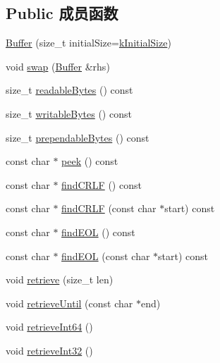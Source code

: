 \subsection*{Public 成员函数}
\begin{DoxyCompactItemize}
\item 
\hyperlink{classmuduo_1_1net_1_1Buffer_a3189a466a75c249c9371b74325e4fc53}{Buffer} (size\+\_\+t initial\+Size=\hyperlink{classmuduo_1_1net_1_1Buffer_a50181a12c6e534352c6c3cf9e0d8b331}{k\+Initial\+Size})
\item 
void \hyperlink{classmuduo_1_1net_1_1Buffer_a5a6560acf9880bf7a3b210c07bb3db2e}{swap} (\hyperlink{classmuduo_1_1net_1_1Buffer}{Buffer} \&rhs)
\item 
size\+\_\+t \hyperlink{classmuduo_1_1net_1_1Buffer_afba1d23196411daa43950fdbbff6d724}{readable\+Bytes} () const
\item 
size\+\_\+t \hyperlink{classmuduo_1_1net_1_1Buffer_a998888da42aba8e7ff1977405f7c33e3}{writable\+Bytes} () const
\item 
size\+\_\+t \hyperlink{classmuduo_1_1net_1_1Buffer_ad738bbd8321f518ca5cdfac842993d04}{prependable\+Bytes} () const
\item 
const char $\ast$ \hyperlink{classmuduo_1_1net_1_1Buffer_ad1339d8b1a42e9762ae6cd3add003706}{peek} () const
\item 
const char $\ast$ \hyperlink{classmuduo_1_1net_1_1Buffer_a757db069730494fc47e500b29851c6c5}{find\+C\+R\+LF} () const
\item 
const char $\ast$ \hyperlink{classmuduo_1_1net_1_1Buffer_ac0c8bd8a269f6d31932e0f7bab608fdf}{find\+C\+R\+LF} (const char $\ast$start) const
\item 
const char $\ast$ \hyperlink{classmuduo_1_1net_1_1Buffer_acf4decda782c75e8f198c95de2958409}{find\+E\+OL} () const
\item 
const char $\ast$ \hyperlink{classmuduo_1_1net_1_1Buffer_a29e5dd77acbc70bc4f98301eb84a29f4}{find\+E\+OL} (const char $\ast$start) const
\item 
void \hyperlink{classmuduo_1_1net_1_1Buffer_a25a9cdb4fcb89f6e3ff071517bdc09e8}{retrieve} (size\+\_\+t len)
\item 
void \hyperlink{classmuduo_1_1net_1_1Buffer_abffa19bdb1fbf4ac36fe0f2375bee1e5}{retrieve\+Until} (const char $\ast$end)
\item 
void \hyperlink{classmuduo_1_1net_1_1Buffer_a31eaec053434837ca42b6abc4319f0ee}{retrieve\+Int64} ()
\item 
void \hyperlink{classmuduo_1_1net_1_1Buffer_a703d91e23ca1b8ab42350d8a9aa67de1}{retrieve\+Int32} ()

\end{DoxyCompactItemize}
